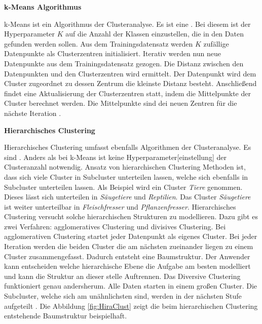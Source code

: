 \textbf{k-Means Algorithmus} \par
k-Means ist ein Algorithmus der Clusteranalyse. Es ist eine . Bei diesem ist der \gls{Hyperparameter} \(K\) auf die Anzahl der Klassen einzustellen, die in den Daten gefunden werden sollen. Aus dem \gls{Trainingsdatensatz} werden \(K\) zufällige Datenpunkte als Clusterzentren initialisiert. Iterativ werden nun neue Datenpunkte aus dem \gls{Trainingsdatensatz} gezogen. Die Distanz zwischen den Datenpunkten und den Clusterzentren wird ermittelt. Der Datenpunkt wird dem Cluster zugeordnet zu dessen Zentrum die kleinste Distanz besteht. Anschließend findet eine Aktualisierung der Clusterzentren statt, indem die Mittelpunkte der Cluster berechnet werden. Die Mittelpunkte sind dei neuen Zentren für die nächste Iteration \cite{Burkov.2019, Goodfellow.2016, Duda.2001}. \dubpar


\textbf{Hierarchisches Clustering} \par
Hierarchisches Clustering umfasst ebenfalls Algorithmen der Clusteranalyse. Es sind . Anders als bei k-Means ist keine \gls{Hyperparameter}[einstellung] der Clusteranzahl notwendig. Ansatz von hierarchischen Clustering Methoden ist, dass sich viele Cluster in Subcluster unterteilen lassen, welche sich ebenfalls in Subcluster unterteilen lassen. Als Beispiel wird ein Cluster \textit{Tiere} genommen. Dieses lässt sich unterteilen in \textit{Säugetiere} und \textit{Reptilien}. Das Cluster \textit{Säugetiere} ist weiter unterteilbar in \textit{Fleischfresser} und \textit{Pflanzenfresser}. Hierarchisches Clustering versucht solche hierarchischen Strukturen zu modellieren. Dazu gibt es zwei Verfahren: agglomeratives Clustering und divisives Clustering. Bei agglomerativen Clustering startet jeder Datenpunkt als eigenes Cluster. Bei jeder Iteration werden die beiden Cluster die am nächsten zueinander liegen zu einem Cluster zusammengefasst. Dadurch entsteht eine Baumstruktur. Der Anwender kann entscheiden welche hierarchische Ebene die Aufgabe am besten modelliert und kann die Struktur an dieser stelle Auftrennen. Das Diversive Clustering funktioniert genau andersherum. Alle Daten starten in einem großen Cluster. Die Subcluster, welche sich am unähnlichsten sind, werden in der nächsten Stufe aufgeteilt \cite{Duda.2001}. Die Abbildung \ref{fig:HiraClust} zeigt die beim hierarchischen Clustering entstehende Baumstruktur beispielhaft. 


